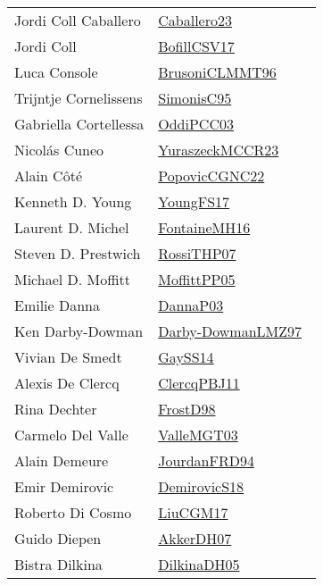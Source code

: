 {\begin{longtable}{p{4cm}p{20cm}}
Jordi Coll Caballero & \href{works/Caballero23.pdf}{Caballero23}~\cite{Caballero23}\\
Jordi Coll & \href{works/BofillCSV17.pdf}{BofillCSV17}~\cite{BofillCSV17}\\
Luca Console & \href{works/BrusoniCLMMT96.pdf}{BrusoniCLMMT96}~\cite{BrusoniCLMMT96}\\
Trijntje Cornelissens & \href{works/SimonisC95.pdf}{SimonisC95}~\cite{SimonisC95}\\
Gabriella Cortellessa & \href{works/OddiPCC03.pdf}{OddiPCC03}~\cite{OddiPCC03}\\
Nicol{\'{a}}s Cuneo & \href{works/YuraszeckMCCR23.pdf}{YuraszeckMCCR23}~\cite{YuraszeckMCCR23}\\
Alain C{\^{o}}t{\'{e}} & \href{works/PopovicCGNC22.pdf}{PopovicCGNC22}~\cite{PopovicCGNC22}\\
Kenneth D. Young & \href{works/YoungFS17.pdf}{YoungFS17}~\cite{YoungFS17}\\
Laurent D. Michel & \href{works/FontaineMH16.pdf}{FontaineMH16}~\cite{FontaineMH16}\\
Steven D. Prestwich & \href{works/RossiTHP07.pdf}{RossiTHP07}~\cite{RossiTHP07}\\
Michael D. Moffitt & \href{works/MoffittPP05.pdf}{MoffittPP05}~\cite{MoffittPP05}\\
Emilie Danna & \href{works/DannaP03.pdf}{DannaP03}~\cite{DannaP03}\\
Ken Darby{-}Dowman & \href{works/Darby-DowmanLMZ97.pdf}{Darby-DowmanLMZ97}~\cite{Darby-DowmanLMZ97}\\
Vivian De Smedt & \href{works/GaySS14.pdf}{GaySS14}~\cite{GaySS14}\\
Alexis De Clercq & \href{works/ClercqPBJ11.pdf}{ClercqPBJ11}~\cite{ClercqPBJ11}\\
Rina Dechter & \href{works/FrostD98.pdf}{FrostD98}~\cite{FrostD98}\\
Carmelo Del Valle & \href{works/ValleMGT03.pdf}{ValleMGT03}~\cite{ValleMGT03}\\
Alain Demeure & \href{}{JourdanFRD94}~\cite{JourdanFRD94}\\
Emir Demirovic & \href{works/DemirovicS18.pdf}{DemirovicS18}~\cite{DemirovicS18}\\
Roberto Di Cosmo & \href{works/LiuCGM17.pdf}{LiuCGM17}~\cite{LiuCGM17}\\
Guido Diepen & \href{works/AkkerDH07.pdf}{AkkerDH07}~\cite{AkkerDH07}\\
Bistra Dilkina & \href{works/DilkinaDH05.pdf}{DilkinaDH05}~\cite{DilkinaDH05}\\

\end{longtable}}
